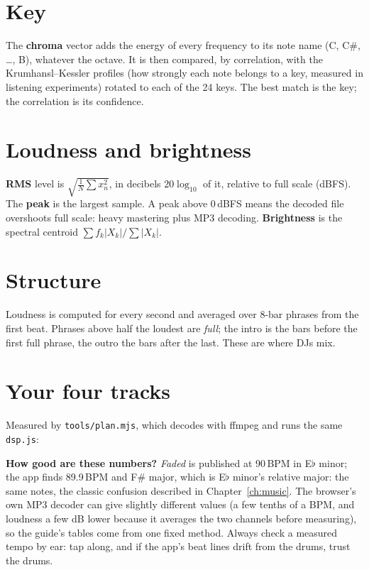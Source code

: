 \section{Key}
The \textbf{chroma} vector adds the energy of every frequency to its note name (C, C\#, \dots, B), whatever the octave. It is then compared, by correlation, with the Krumhansl--Kessler profiles (how strongly each note belongs to a key, measured in listening experiments) rotated to each of the 24 keys. The best match is the key; the correlation is its confidence.

\section{Loudness and brightness}
\textbf{RMS} level is $\sqrt{\tfrac{1}{N}\sum x_n^2}$, in decibels $20\log_{10}$ of it, relative to full scale (dBFS). The \textbf{peak} is the largest sample. A peak above 0\,dBFS means the decoded file overshoots full scale: heavy mastering plus MP3 decoding. \textbf{Brightness} is the spectral centroid $\sum f_k |X_k| / \sum |X_k|$.

\section{Structure}
Loudness is computed for every second and averaged over 8-bar phrases from the first beat. Phrases above half the loudest are \emph{full}; the intro is the bars before the first full phrase, the outro the bars after the last. These are where DJs mix.

\section{Your four tracks}
Measured by \texttt{tools/plan.mjs}, which decodes with ffmpeg and runs the same \texttt{dsp.js}:



\textbf{How good are these numbers?} \emph{Faded} is published at 90\,BPM in E$\flat$ minor; the app finds 89.9\,BPM and F\# major, which is E$\flat$ minor's relative major: the same notes, the classic confusion described in Chapter~\ref{ch:music}. The browser's own MP3 decoder can give slightly different values (a few tenths of a BPM, and loudness a few dB lower because it averages the two channels before measuring), so the guide's tables come from one fixed method. Always check a measured tempo by ear: tap along, and if the app's beat lines drift from the drums, trust the drums.
